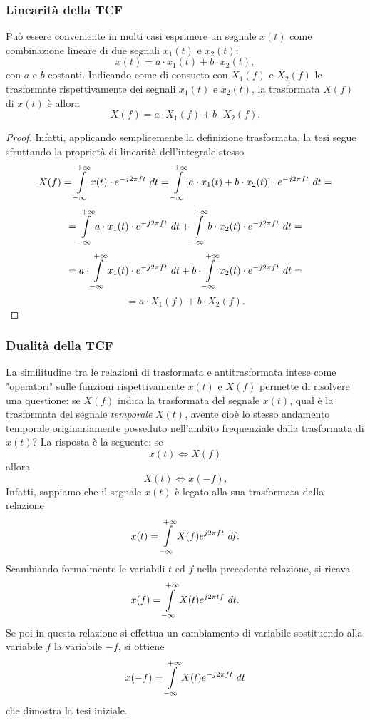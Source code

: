 \documentclass[12pt,oneside,openany]{memoir}
\numberwithin{equation}{subsection}
\newcommand{\dt}{\ dt}
\begin{document}
\subsubsection{Linearit\`a della TCF}
Pu\`o essere conveniente in molti casi esprimere un segnale $x(t)$ come
combinazione lineare di due segnali $x_1(t)$ e $x_2(t)$:
\[
	x(t) = a \cdot x_1(t) + b \cdot x_2(t),
\]
con $a$ e $b$ costanti. Indicando come di consueto con $X_1(f)$ e $X_2(f)$ le
trasformate rispettivamente dei segnali $x_1(t)$ e $x_2(t)$, la trasformata
$X(f)$ di $x(t)$ \`e allora
\[
	X(f) = a \cdot X_1(f) + b \cdot X_2(f).
\]
\begin{proof}
Infatti, applicando semplicemente la definizione trasformata, la tesi segue
sfruttando la propriet\`a di linearit\`a dell'integrale stesso
\[
	X(f) = \int\displaylimits_{-\infty}^{+\infty} x(t) \cdot
	e^{-j 2 \pi f t} \dt = \int\displaylimits_{-\infty}^{+\infty} [a 
	\cdot x_1(t) + b \cdot x_2(t)] \cdot e^{-j 2 \pi f t} \dt =
\]
\[
	= \int\displaylimits_{-\infty}^{+\infty} a \cdot x_1(t) \cdot 
	e^{-j 2 \pi f t} \dt + \int\displaylimits_{-\infty}^{+\infty} b 
	\cdot x_2(t) \cdot e^{-j 2 \pi f t} \dt =
\]
\[
	= a \cdot \int\displaylimits_{-\infty}^{+\infty} x_1(t) \cdot 
	e^{-j 2 \pi f t} \dt + b \cdot \int\displaylimits_{-\infty}^{+\infty} 
	x_2(t) \cdot e^{-j 2 \pi f t} \dt =
\]
\[
	= a \cdot X_1(f) + b \cdot X_2(f).
\]
\end{proof}


\newpage
\subsubsection{Dualit\`a della TCF}
La similitudine tra le relazioni di trasformata e antitrasformata intese come
"operatori" sulle funzioni rispettivamente $x(t)$ e $X(f)$ permette di risolvere
una questione: se $X(f)$ indica la trasformata del segnale $x(t)$, qual \`e la
trasformata del segnale \textit{temporale} $X(t)$, avente cio\`e lo stesso
andamento temporale originariamente posseduto nell'ambito frequenziale dalla
trasformata di $x(t)$? La risposta \`e la seguente: se
\[
	x(t) \iff X(f)
\]
allora
\[
	X(t) \iff x(-f).
\]
Infatti, sappiamo che il segnale $x(t)$ \`e legato alla sua trasformata dalla
relazione
\[
	x(t) = \int\displaylimits_{-\infty}^{+\infty} X(f) e^{j 2 \pi f t} \ df.
\]
Scambiando formalmente le variabili $t$ ed $f$ nella precedente relazione, si
ricava
\[
	x(f) = \int\displaylimits_{-\infty}^{+\infty} X(t) e^{j 2 \pi t f} \ dt.
\]
Se poi in questa relazione si effettua un cambiamento di variabile sostituendo
alla variabile $f$ la variabile $-f$, si ottiene
\[
	x(-f) = \int\displaylimits_{-\infty}^{+\infty} X(t) e^{-j 2 \pi f t} \dt
\]
che dimostra la tesi iniziale.
\end{document}
